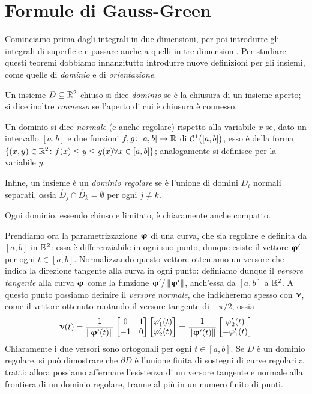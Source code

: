 \section{Formule di Gauss-Green}
Cominciamo prima dagli integrali in due dimensioni, per poi introdurre gli integrali di superficie e passare anche a quelli in tre dimensioni.
Per studiare questi teoremi dobbiamo innanzitutto introdurre nuove definizioni per gli insiemi, come quelle di \emph{dominio} e di \emph{orientazione}.
\begin{definizione} \label{d:dominio}
	Un insieme $D\subseteq\mathbb{R}^2$ chiuso si dice \emph{dominio} se è la chiusura di un insieme aperto; si dice inoltre \emph{connesso} se l'aperto di cui è chiusura è connesso.

	Un dominio si dice \emph{normale} (e anche regolare) rispetto alla variabile $x$ se, dato un intervallo $[a,b]$ e due funzioni $f,g\colon[a,b]\to\mathbb{R}$ di $\mathcal{C}^{{1}}\big([a,b]\big)$, esso è della forma $\{(x,y)\in\mathbb{R}^2\colon f(x)\leq y\leq g(x) \forall x\in[a,b]\}$; analogamente si definisce per la variabile $y$.

	Infine, un insieme è un \emph{dominio regolare} se è l'unione di domini $D_i$ normali separati, ossia $\mathring{D_j}\cap\mathring{D_k}=\emptyset$ per ogni $j\neq k$.
\end{definizione}
Ogni dominio, essendo chiuso e limitato, è chiaramente anche compatto.

Prendiamo ora la parametrizzazione $\bm{\upvarphi}$ di una curva, che sia regolare e definita da $[a,b]$ in $\mathbb{R}^2$: essa è differenziabile in ogni suo punto, dunque esiste il vettore $\bm{\upvarphi}'$ per ogni $t\in[a,b]$.
Normalizzando questo vettore otteniamo un versore che indica la direzione tangente alla curva in ogni punto: definiamo dunque il \emph{versore tangente} alla curva $\bm{\upvarphi}$ come la funzione $\bm{\upvarphi}'/\left\|{\bm{\upvarphi}'}\right\|$, anch'essa da $[a,b]$ a $\mathbb{R}^2$.
A questo punto possiamo definire il \emph{versore normale}, che indicheremo spesso con $\bm{\upnu}$, come il vettore ottenuto ruotando il versore tangente di $-\pi/2$, ossia
\begin{equation*}
	\bm{\upnu}(t)=\frac1{\left\|{\bm{\upvarphi}'(t)}\right\|}
	\begin{bmatrix}
		0&1\\-1&0
	\end{bmatrix}
	\begin{bmatrix}
		\varphi'_1(t)\\\varphi'_2(t)
	\end{bmatrix}
	=\frac1{\left\|{\bm{\upvarphi}'(t)}\right\|}
	\begin{bmatrix}
		\varphi'_2(t)\\-\varphi'_1(t)
	\end{bmatrix}
\end{equation*}
Chiaramente i due versori sono ortogonali per ogni $t\in[a,b]$.
Se $D$ è un dominio regolare, si può dimostrare che $\partial D$ è l'unione finita di sostegni di curve regolari a tratti: allora possiamo affermare l'esistenza di un versore tangente e normale alla frontiera di un dominio regolare, tranne al più in un numero finito di punti.

